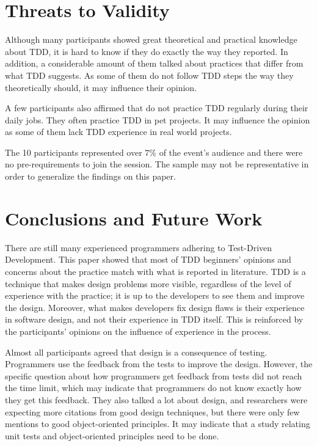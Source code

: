 \section{Threats to Validity}
\label{sec:threats-to-validity}

Although many participants showed great theoretical and practical knowledge
about TDD, it is hard to know if they do exactly the way they reported.
In addition, a considerable amount of them talked about practices that differ
from what TDD suggests.
As some of them do not follow TDD steps the way they theoretically should, it
may influence their opinion.

A few participants also affirmed that do not practice TDD regularly during their
daily jobs. They often practice TDD in pet projects. It may influence the
opinion as some of them lack TDD experience in real world projects.

The 10 participants represented over 7\% of the event's audience and there were
no pre-requirements to join the session. The sample may not be representative in
order to generalize the findings on this paper.

\section{Conclusions and Future Work}

There are still many experienced programmers adhering to Test-Driven
Development. This paper showed that most of TDD beginners' opinions and concerns
about the practice match with what is reported in literature. 
TDD is a technique that makes design problems more visible, regardless of the
level of experience with the practice; it is up to the developers to see them
and improve the design. Moreover, what makes developers fix design flaws is
their experience in software design, and not their experience in TDD itself. 
This is reinforced by the participants' opinions on the influence of experience
in the process.

Almost all participants agreed that design is a consequence of testing.
Programmers use the feedback from the tests to improve the
design. However, the specific question about how programmers get feedback from
tests did not reach the time limit, which may indicate that programmers do not
know exactly how they get this feedback.
They also talked a lot about design, and researchers were expecting
more citations from good design techniques, but there were only few
mentions to good object-oriented principles. It may indicate that a study
relating unit tests and object-oriented principles need to be done.

